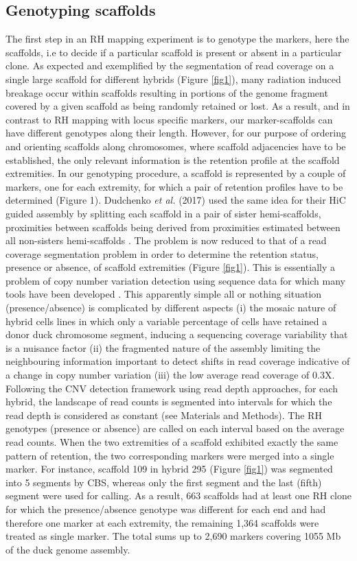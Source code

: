 \documentclass[10pt,letterpaper]{article}
\begin{document}
\subsection*{Genotyping scaffolds}
The first step in an RH mapping experiment is to genotype the markers, here the scaffolds, i.e to decide if a particular scaffold is present or absent in a particular clone. 
 As expected and exemplified by the segmentation of read coverage on a single large scaffold for different hybrids (Figure \ref{fig1}), many radiation induced breakage occur within scaffolds resulting in portions of the genome fragment covered by a given scaffold as being randomly retained or lost. 
As a result, and in contrast to RH mapping with locus specific markers, our marker-scaffolds can have different genotypes along their length. 
However, for our purpose of ordering and orienting scaffolds along chromosomes, where scaffold adjacencies have to be established, the only relevant information is the retention profile at the scaffold extremities. 
In our genotyping procedure, a scaffold is represented by a couple of markers, one for each extremity, for which a pair of retention profiles have to be determined (Figure 1). Dudchenko {\em et al.} (2017) used the same idea for their HiC guided assembly by splitting each scaffold in a pair of sister hemi-scaffolds, proximities between scaffolds being derived from proximities estimated between all non-sisters hemi-scaffolds \cite{Dudchenko2017}. 
The problem is now reduced to that of a read coverage segmentation problem in order to determine the retention status, presence or absence, of scaffold extremities (Figure \ref{fig1}). 
This is essentially a problem of copy number variation detection using sequence data for which many tools have been developed \cite{Teo2012}.
This apparently simple all or nothing situation (presence/absence) is complicated by different aspects (i) the mosaic nature of hybrid cells lines in which only a variable percentage of cells have retained a donor duck chromosome segment, inducing a sequencing coverage variability that is a nuisance factor (ii) the fragmented nature of the assembly limiting the neighbouring information important to detect shifts in read coverage indicative of a change in copy number variation (iii) the low average read coverage of 0.3X.
Following the CNV detection framework using read depth approaches, for each hybrid, the landscape of read counts is segmented into intervals for which the read depth is considered as constant (see Materials and Methods). The RH genotypes (presence or absence) are called on each interval based on the average read counts. When the two extremities of a scaffold exhibited exactly the same pattern of retention, the two corresponding markers were merged into a single marker. For instance, scaffold 109 in hybrid 295 (Figure \ref{fig1}) was segmented into 5 segments by CBS, whereas only the first segment and the last (fifth) segment were used for calling. As a result, 663 scaffolds had at least one RH clone for which the presence/absence genotype was different for each end and had therefore one marker at each extremity, the remaining 1,364 scaffolds were treated as single marker. The total sums up to 2,690 markers covering 1055 Mb of the duck genome assembly.
\end{document}
